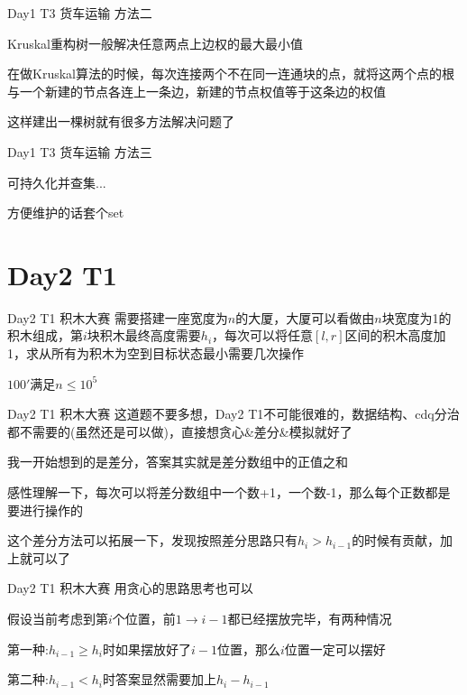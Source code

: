 \documentclass[10pt]{beamer}
\begin{document}
  \begin{frame}{Day1 T3 货车运输}
     方法二

     Kruskal重构树一般解决任意两点上边权的最大最小值

     在做Kruskal算法的时候，每次连接两个不在同一连通块的点，就将这两个点的根与一个新建的节点各连上一条边，新建的节点权值等于这条边的权值

     这样建出一棵树就有很多方法解决问题了
  \end{frame}

  \begin{frame}{Day1 T3 货车运输}
     方法三

     可持久化并查集...

     方便维护的话套个set
  \end{frame}

  \section{Day2 T1}

  \begin{frame}{Day2 T1 积木大赛}
     需要搭建一座宽度为$n$的大厦，大厦可以看做由$n$块宽度为1的积木组成，第$i$块积木最终高度需要$h_i$，每次可以将任意$[l,r]$区间的积木高度加1，求从所有为积木为空到目标状态最小需要几次操作
    
     $100'$满足$n\leq 10^5$
  \end{frame}

  \begin{frame}{Day2 T1 积木大赛}
     这道题不要多想，Day2 T1不可能很难的，数据结构、cdq分治都不需要的(虽然还是可以做)，直接想贪心\&差分\&模拟就好了
    
     我一开始想到的是差分，答案其实就是差分数组中的正值之和

     感性理解一下，每次可以将差分数组中一个数+1，一个数-1，那么每个正数都是要进行操作的

     这个差分方法可以拓展一下，发现按照差分思路只有$h_i>h_{i-1}$的时候有贡献，加上就可以了
  \end{frame}

  \begin{frame}{Day2 T1 积木大赛} 
     用贪心的思路思考也可以
    
     假设当前考虑到第$i$个位置，前$1\rightarrow i-1$都已经摆放完毕，有两种情况

     第一种:$h_{i-1}\geq h_i$时如果摆放好了$i-1$位置，那么$i$位置一定可以摆好

     第二种:$h_{i-1}<h_i$时答案显然需要加上$h_i-h_{i-1}$
  \end{frame}
\end{document}
